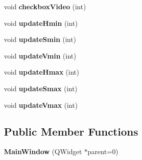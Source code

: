 \begin{DoxyCompactItemize}
\item 
void {\bfseries checkbox\+Video} (int)\hypertarget{classMainWindow_a33f858356490a2440246af76ca922392}{}\label{classMainWindow_a33f858356490a2440246af76ca922392}

\item 
void {\bfseries update\+Hmin} (int)\hypertarget{classMainWindow_afffdad16c118e2351cec7b47c243e9b1}{}\label{classMainWindow_afffdad16c118e2351cec7b47c243e9b1}

\item 
void {\bfseries update\+Smin} (int)\hypertarget{classMainWindow_a11f3aa0b929685232b671cd378d31972}{}\label{classMainWindow_a11f3aa0b929685232b671cd378d31972}

\item 
void {\bfseries update\+Vmin} (int)\hypertarget{classMainWindow_a43da847294670cdaaa17f2235888b47a}{}\label{classMainWindow_a43da847294670cdaaa17f2235888b47a}

\item 
void {\bfseries update\+Hmax} (int)\hypertarget{classMainWindow_af3d7639f0c28d053fdc10484b109ac99}{}\label{classMainWindow_af3d7639f0c28d053fdc10484b109ac99}

\item 
void {\bfseries update\+Smax} (int)\hypertarget{classMainWindow_a2c08d2f7c55d78c30b12dd3a16905d7b}{}\label{classMainWindow_a2c08d2f7c55d78c30b12dd3a16905d7b}

\item 
void {\bfseries update\+Vmax} (int)\hypertarget{classMainWindow_a2f06abb52f3906ae6177f7fc9f859505}{}\label{classMainWindow_a2f06abb52f3906ae6177f7fc9f859505}

\end{DoxyCompactItemize}
\subsection*{Public Member Functions}
\begin{DoxyCompactItemize}
\item 
{\bfseries Main\+Window} (Q\+Widget $\ast$parent=0)\hypertarget{classMainWindow_a8b244be8b7b7db1b08de2a2acb9409db}{}\label{classMainWindow_a8b244be8b7b7db1b08de2a2acb9409db}

\end{DoxyCompactItemize}

